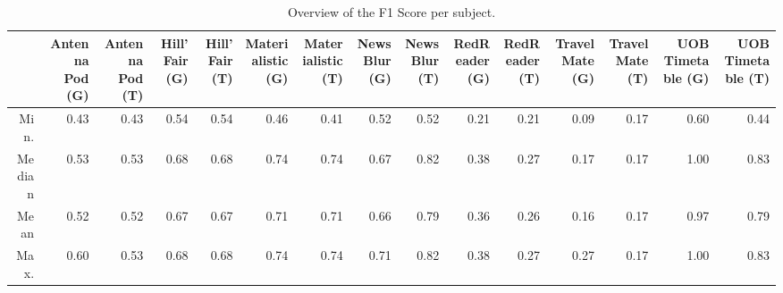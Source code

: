 \begin{table}[ht]
\centering
\begin{tabular}{rrrrrrrrrrrrrrr}
  \hline
 & Antenna Pod (G) & Antenna Pod (T) & Hill'Fair (G) & Hill'Fair (T) & Materialistic (G) & Materialistic (T) & NewsBlur (G) & NewsBlur (T) & RedReader (G) & RedReader (T) & Travel Mate (G) & Travel Mate (T) & UOB Timetable (G) & UOB Timetable (T) \\ 
  \hline
Min. & 0.43 & 0.43 & 0.54 & 0.54 & 0.46 & 0.41 & 0.52 & 0.52 & 0.21 & 0.21 & 0.09 & 0.17 & 0.60 & 0.44 \\ 
  Median & 0.53 & 0.53 & 0.68 & 0.68 & 0.74 & 0.74 & 0.67 & 0.82 & 0.38 & 0.27 & 0.17 & 0.17 & 1.00 & 0.83 \\ 
  Mean & 0.52 & 0.52 & 0.67 & 0.67 & 0.71 & 0.71 & 0.66 & 0.79 & 0.36 & 0.26 & 0.16 & 0.17 & 0.97 & 0.79 \\ 
  Max. & 0.60 & 0.53 & 0.68 & 0.68 & 0.74 & 0.74 & 0.71 & 0.82 & 0.38 & 0.27 & 0.27 & 0.17 & 1.00 & 0.83 \\ 
   \hline
\end{tabular}
\caption{Overview of the F1 Score per subject.} 
\label{tab:results:rq4:summary:subject:f1_score}
\end{table}
